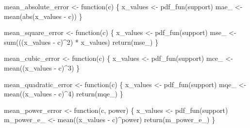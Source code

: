 \documentclass[
  letterpaper,
  DIV=11,
  numbers=noendperiod]{scrreprt}
\newenvironment{Shaded}{\begin{snugshade}}{\end{snugshade}}
\newcommand{\ControlFlowTok}[1]{\textcolor[rgb]{0.00,0.23,0.31}{#1}}
\newcommand{\DecValTok}[1]{\textcolor[rgb]{0.68,0.00,0.00}{#1}}
\newcommand{\FunctionTok}[1]{\textcolor[rgb]{0.28,0.35,0.67}{#1}}
\newcommand{\NormalTok}[1]{\textcolor[rgb]{0.00,0.23,0.31}{#1}}
\newcommand{\OtherTok}[1]{\textcolor[rgb]{0.00,0.23,0.31}{#1}}
\newcommand{\SpecialCharTok}[1]{\textcolor[rgb]{0.37,0.37,0.37}{#1}}
\begin{document}
\begin{Shaded}
\begin{Highlighting}[]
\NormalTok{mean\_absolute\_error }\OtherTok{\textless{}{-}} \ControlFlowTok{function}\NormalTok{(c) \{ }
\NormalTok{  x\_values }\OtherTok{\textless{}{-}} \FunctionTok{pdf\_fun}\NormalTok{(support)}
\NormalTok{  mae\_     }\OtherTok{\textless{}{-}} \FunctionTok{mean}\NormalTok{(}\FunctionTok{abs}\NormalTok{(x\_values }\SpecialCharTok{{-}}\NormalTok{ c))}
\NormalTok{\}}

\NormalTok{mean\_square\_error }\OtherTok{\textless{}{-}} \ControlFlowTok{function}\NormalTok{(c) \{ }
\NormalTok{  x\_values }\OtherTok{\textless{}{-}} \FunctionTok{pdf\_fun}\NormalTok{(support)}
\NormalTok{  mse\_     }\OtherTok{\textless{}{-}} \FunctionTok{sum}\NormalTok{(((x\_values }\SpecialCharTok{{-}}\NormalTok{ c)}\SpecialCharTok{\^{}}\DecValTok{2}\NormalTok{) }\SpecialCharTok{*}\NormalTok{ x\_values)}
  \FunctionTok{return}\NormalTok{(mse\_)}
\NormalTok{\}}

\NormalTok{mean\_cubic\_error }\OtherTok{\textless{}{-}} \ControlFlowTok{function}\NormalTok{(c) \{ }
\NormalTok{  x\_values }\OtherTok{\textless{}{-}} \FunctionTok{pdf\_fun}\NormalTok{(support) }
\NormalTok{  mce\_     }\OtherTok{\textless{}{-}} \FunctionTok{mean}\NormalTok{((x\_values }\SpecialCharTok{{-}}\NormalTok{ c)}\SpecialCharTok{\^{}}\DecValTok{3}\NormalTok{)}
\NormalTok{\}}

\NormalTok{mean\_quadratic\_error }\OtherTok{\textless{}{-}} \ControlFlowTok{function}\NormalTok{(c) \{ }
\NormalTok{  x\_values }\OtherTok{\textless{}{-}} \FunctionTok{pdf\_fun}\NormalTok{(support)}
\NormalTok{  mqe\_     }\OtherTok{\textless{}{-}} \FunctionTok{mean}\NormalTok{((x\_values }\SpecialCharTok{{-}}\NormalTok{ c)}\SpecialCharTok{\^{}}\DecValTok{4}\NormalTok{)}
  \FunctionTok{return}\NormalTok{(mqe\_)}
\NormalTok{\}}

\NormalTok{mean\_power\_error }\OtherTok{\textless{}{-}} \ControlFlowTok{function}\NormalTok{(c, power) \{ }
\NormalTok{  x\_values }\OtherTok{\textless{}{-}} \FunctionTok{pdf\_fun}\NormalTok{(support)}
\NormalTok{  m\_power\_e\_     }\OtherTok{\textless{}{-}} \FunctionTok{mean}\NormalTok{((x\_values }\SpecialCharTok{{-}}\NormalTok{ c)}\SpecialCharTok{\^{}}\NormalTok{power)}
  \FunctionTok{return}\NormalTok{(m\_power\_e\_)}
\NormalTok{\}}
\end{Highlighting}
\end{Shaded}
\end{document}
